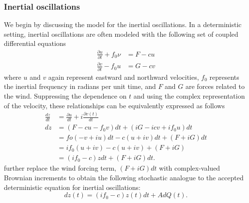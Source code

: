 \documentclass{stat572Style}
\begin{document}
\subsubsection{Inertial oscillations}
We begin by discussing the model for the inertial oscillations. In a deterministic setting, inertial oscillations are often modeled with the following set of coupled differential equations \citep{Pollard1970}
\begin{align}
\frac{\partial u }{\partial t}  + f_{0} \nu &= F - cu \\ \nonumber
\frac{\partial v}{\partial t} - f_{0}u &= G - cv
\end{align}
where $u$ and $v$ again represent eastward and northward velocities, $f_{0}$ represents the inertial frequency in radians per unit time, and $F$ and $G$ are forces related to the wind. Suppressing the dependence on $t$ and using the complex representation of the velocity,  these relationships can be equivalently expressed as follows
\begin{align}
\label{eq:diffEqDeriv}
\frac{dz}{dt} &= \frac{\partial u}{dt} + i\frac{\partial v(t)}{dt}\\ \nonumber
dz &= (F - c u- f_{0}v)dt + (iG - icv + if_{0}u)dt\\ \nonumber
&= fo(-v + iu)dt - c(u + iv)dt + (F + iG)dt\\ \nonumber
&= if_{0}(u + iv) - c(u + iv) + (F + iG)\\ \nonumber
&= (if_{0} - c)z dt + (F + iG)dt. 
\end{align}
 \citet{Sykulski2016} further replace the wind forcing term, $(F + iG)dt$  with complex-valued Brownian increments \citep{Mandelbrot1968} to obtain  the following stochastic analogue to the accepted deterministic equation for inertial oscillations:
 \begin{equation}
\label{eq:ouEq}
dz(t) = (i f_{0} -c) z(t) dt + A d Q(t). 
\end{equation}  
\end{document}

